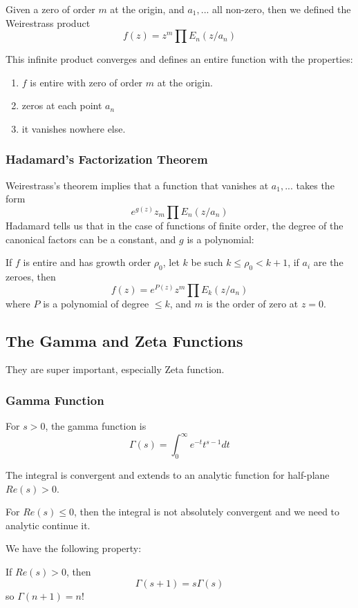 \documentclass[main.tex]{subfiles}
\begin{document}
Given a zero of order $m$ at the origin, and $a_1, ...$ all non-zero, then we defined the Weirestrass product
$$
f(z) = z^m \prod E_n(z/a_n)
$$

\begin{theorem}
This infinite product converges and defines an entire function with the properties:
\begin{enumerate}
    \item $f$ is entire with zero of order $m$ at the origin.
    \item zeros at each point $a_n$
    \item it vanishes nowhere else.
\end{enumerate}
\end{theorem}


\subsubsection{Hadamard's Factorization Theorem}
Weirestrass's theorem implies that a function that vanishes at $a_1, ...$ takes the form
$$
e^{g(z)}z_m \prod E_n(z/a_n)
$$
Hadamard tells us that in the case of functions of finite order, the degree of the canonical factors can be a constant, and $g$ is a polynomial:
\begin{theorem}
If $f$ is entire and has growth order $\rho_0$, let $k$ be such $k \leq \rho_0 < k+1$, if $a_i$ are the zeroes, then 
$$
f(z) = e^{P(z)}z^m \prod E_k(z/a_n)
$$
where $P$ is a polynomial of degree $\leq k$, and $m$ is the order of zero at $z =0$.
\end{theorem}

\subsection{The Gamma and Zeta Functions}
They are super important, especially Zeta function.

\subsubsection{Gamma Function}
For $s > 0$, the gamma function is 
$$
\Gamma(s) = \int_0 ^{\infty} e^{-t} t^{s-1} dt
$$

The integral is convergent and extends to an analytic function for half-plane $Re(s) > 0$.

For $Re(s) \leq 0$, then the integral is not absolutely convergent and we need to analytic continue it.

We have the following property:
\begin{lemma}
If $Re(s) > 0$, then 
$$
\Gamma(s+ 1) = s \Gamma(s)
$$
so $\Gamma(n+1) = n!$
\end{lemma}
\end{document}
